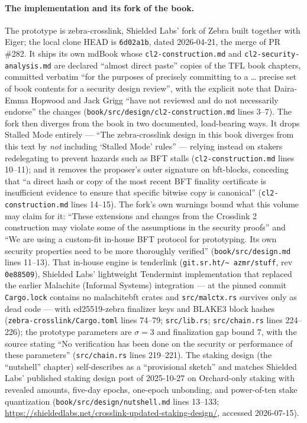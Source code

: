 \documentclass[11pt,a4paper]{article}
\theoremstyle{definition}
\begin{document}
\paragraph{The implementation and its fork of the book.} The prototype
is zebra-crosslink, Shielded Labs' fork of Zebra built together with
Eiger; the local clone HEAD is \texttt{6d02a1b}, dated 2026-04-21, the
merge of PR \#282. It ships its own mdBook whose
\texttt{cl2-construction.md} and \texttt{cl2-security-analysis.md} are
declared ``almost direct paste'' copies of the TFL book chapters,
committed verbatim ``for the purposes of precisely committing to a
\ldots{} precise set of book contents for a security design review'',
with the explicit note that Daira-Emma Hopwood and Jack Grigg ``have not
reviewed and do not necessarily endorse'' the changes
(\texttt{book/src/design/cl2-construction.md} lines 3--7). The fork then
diverges from the book in two documented, load-bearing ways. It drops
Stalled Mode entirely --- ``The zebra-crosslink design in this book
diverges from this text by \emph{not} including `Stalled Mode' rules''
--- relying instead on stakers redelegating to prevent hazards such as
BFT stalls (\texttt{cl2-construction.md} lines 10--11); and it removes
the proposer's outer signature on bft-blocks, conceding that ``a direct
hash or copy of the most recent BFT finality certificate is insufficient
evidence to ensure that specific bitwise copy is canonical''
(\texttt{cl2-construction.md} lines 14--15). The fork's own warnings
bound what this volume may claim for it: ``These extensions and changes
from the Crosslink 2 construction may violate some of the assumptions in
the security proofs'' and ``We are using a custom-fit in-house BFT
protocol for prototyping. Its own security properties need to be more
thoroughly verified'' (\texttt{book/src/design.md} lines 11--13). That
in-house engine is tenderlink (\texttt{git.sr.ht/\textasciitilde
azmr/stuff}, rev \texttt{0e88509}), Shielded Labs' lightweight
Tendermint implementation that replaced the earlier Malachite (Informal
Systems) integration --- at the pinned commit \texttt{Cargo.lock}
contains no malachitebft crates and \texttt{src/malctx.rs} survives only
as dead code --- with ed25519-zebra finalizer keys and BLAKE3 block
hashes (\texttt{zebra-crosslink/Cargo.toml} lines 74--79;
\texttt{src/lib.rs}; \texttt{src/chain.rs} lines 224--226); the
prototype parameters are $\sigma = 3$ and finalization gap bound $7$,
with the source stating ``No verification has been done on the security
or performance of these parameters'' (\texttt{src/chain.rs} lines
219--221). The staking design (the ``nutshell'' chapter) self-describes
as a ``provisional sketch'' and matches Shielded Labs' published staking
design post of 2025-10-27 on Orchard-only staking with revealed amounts,
five-day epochs, one-epoch unbonding, and power-of-ten stake
quantization (\texttt{book/src/design/nutshell.md} lines 13--133;
\url{https://shieldedlabs.net/crosslink-updated-staking-design/},
accessed 2026-07-15).
\end{document}
